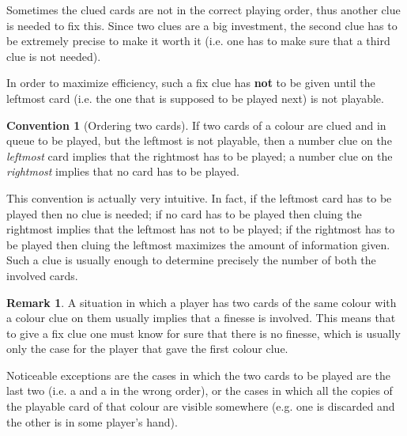 \documentclass[a4paper]{article}
\theoremstyle{plain}
\theoremstyle{definition}
\newtheorem{remark}[theorem]{Remark}
\newtheorem{convention}[theorem]{Convention}
\begin{document}
Sometimes the clued cards are not in the correct playing order, thus another clue is needed to fix this. Since two clues are a big investment, the second clue has to be extremely precise to make it worth it (i.e. one has to make sure that a third clue is not needed).

In order to maximize efficiency, such a fix clue has \textbf{not} to be given until the leftmost card (i.e. the one that is supposed to be played next) is not playable.

\begin{convention}[Ordering two cards]
	If two cards of a colour are clued and in queue to be played, but the leftmost is not playable, then a number clue on the \textit{leftmost} card implies that the rightmost has to be played; a number clue on the \textit{rightmost} implies that no card has to be played.
\end{convention}

This convention is actually very intuitive. In fact, if the leftmost card has to be played then no clue is needed; if no card has to be played then cluing the rightmost implies that the leftmost has not to be played; if the rightmost has to be played then cluing the leftmost maximizes the amount of information given. Such a clue is usually enough to determine precisely the number of both the involved cards.

\begin{remark}
	A situation in which a player has two cards of the same colour with a colour clue on them usually implies that a finesse is involved. This means that to give a fix clue one must know for sure that there is no finesse, which is usually only the case for the player that gave the first colour clue.
	
	Noticeable exceptions are the cases in which the two cards to be played are the last two (i.e. a  and a  in the wrong order), or the cases in which all the copies of the playable card of that colour are visible somewhere (e.g. one is discarded and the other is in some player's hand).
\end{remark}
\end{document}
